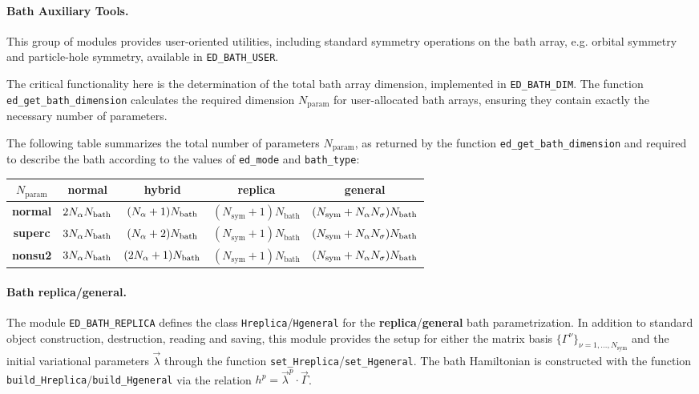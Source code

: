 \documentclass[edipack_sp.tex]{subfiles}
\begin{document}
\paragraph{Bath Auxiliary Tools.}
This group of modules provides user-oriented utilities, including 
standard symmetry operations on the bath array, e.g. orbital 
symmetry and particle-hole symmetry, available in 
{\tt ED\_BATH\_USER}. 

The critical functionality here is the 
determination of the total bath array dimension, implemented in 
{\tt ED\_BATH\_DIM}. The function {\tt ed\_get\_bath\_dimension} 
calculates the required dimension $N_\mathrm{param}$ for user-allocated bath 
arrays, ensuring they contain exactly the necessary number of 
parameters. 

The following table summarizes the total number of parameters $N_\mathrm{param}$, as returned by the function {\tt ed\_get\_bath\_dimension} and required to describe the bath according to the values of {\tt ed\_mode} and {\tt bath\_type}:

\begin{center}
\begin{tabular}{ |c||c|c|c|c| } 
 \hline     
 $N_\mathrm{param}$ & {\bf normal} & {\bf hybrid} & {\bf replica} & {\bf general}\\
 \hline 
 \hline    
 {\bf normal} & 
 $2N_\alpha N_\mathrm{bath}$ & 
 $(N_\alpha+1)N_\mathrm{bath}$ & 
 $(N_\mathrm{sym}+1)N_\mathrm{bath}$ & 
 $(N_\mathrm{sym}+N_\alpha N_\sigma)N_\mathrm{bath}$\\
 \hline
   {\bf superc} & $3N_\alpha N_\mathrm{bath}$ & 
 $(N_\alpha+2)N_\mathrm{bath}$ & 
 $(N_\mathrm{sym}+1)N_\mathrm{bath}$ & 
 $(N_\mathrm{sym}+N_\alpha N_\sigma)N_\mathrm{bath}$\\
 \hline
   {\bf nonsu2} & $3N_\alpha N_\mathrm{bath}$ & 
 $(2N_\alpha+1)N_\mathrm{bath}$ & 
 $(N_\mathrm{sym}+1)N_\mathrm{bath}$ & 
 $(N_\mathrm{sym}+N_\alpha N_\sigma)N_\mathrm{bath}$\\
 \hline
\end{tabular}
\end{center}

\paragraph{Bath replica/general.}
The module {\tt ED\_BATH\_REPLICA} defines the class {\tt Hreplica}/{\tt Hge\-ne\-ral} for the {\bf replica}/{\bf general} bath parametrization. In  addition to standard object construction, destruction, reading and saving, this module provides the setup for either the matrix basis  
$\{ \Gamma^\nu \}_{\nu=1,\dots,N_\mathrm{sym}}$ and the initial variational parameters $\vec{\lambda}$ through the function  {\tt set\_Hreplica}/{\tt set\_Hge\-ne\-ral}. 
%
The bath Hamiltonian is constructed with the function 
{\tt build\_Hreplica}/{\tt build\_Hge\-ne\-ral} via the relation
$
h^p = \vec{\lambda}^p \cdot \vec{\Gamma}
$.
\end{document}
